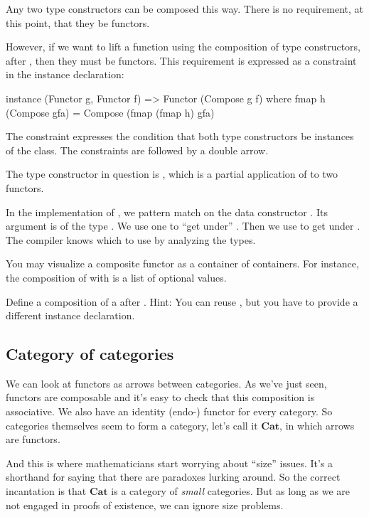 \documentclass[DaoFP]{subfiles}
\begin{document}
Any two type constructors can be composed this way. There is no requirement, at this point, that they be functors. 

However, if we want to lift a function using the composition of type constructors,  after , then they must be functors. This requirement is expressed as a constraint in the instance declaration:
\begin{haskell}
instance (Functor g, Functor f) => Functor (Compose g f) where
  fmap h (Compose gfa) = Compose (fmap (fmap h) gfa)
\end{haskell}
The constraint  expresses the condition that both type constructors be instances of the  class. The constraints are followed by a double arrow. 

The type constructor in question is , which is a partial application of  to two functors. 

In the implementation of , we pattern match on the data constructor . Its argument  is of the type . We use one  to ``get under'' . Then we use  to get under . The compiler knows which  to use by analyzing the types. 

You may visualize a composite functor as a container of containers. For instance, the composition of \hask{[]} with  is a list of optional values. 

\begin{exercise}
Define a composition of a  after . Hint: You can reuse , but you have to provide a different instance declaration.
\end{exercise}


\subsection{Category of categories}

We can look at functors as arrows between categories. As we've just seen, functors are composable and it's easy to check that this composition is associative. We also have an identity (endo-) functor for every category. So categories themselves seem to form a category, let's call it $\mathbf{Cat}$, in which arrows are functors. 

And this is where mathematicians start worrying about ``size'' issues. It's a shorthand for saying that there are paradoxes lurking around. So the correct incantation is that $\mathbf{Cat}$ is a category of \emph{small} categories. But as long as we are not engaged in proofs of existence, we can ignore size problems.
\end{document}
